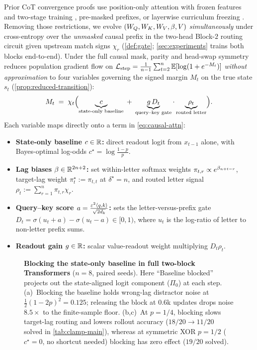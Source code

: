 Prior CoT convergence proofs use position-only attention with frozen features and two-stage training \citep{kim2024parity}, pre-masked prefixes, or layerwise curriculum freezing \citep{wen2024sparse,huang2025cotgd}. Removing those restrictions, we evolve $(W_Q, W_K, W_V, \beta, V)$ \emph{simultaneously} under cross-entropy over the \emph{unmasked} causal prefix in the two-head Block-$2$ routing circuit given upstream match signs $\chi_r$ (\cref{def:gate}; \cref{sec:experiments} trains both blocks end-to-end). Under the full causal mask, parity and head-swap symmetry reduces population gradient flow on $\mathcal L_{\mathrm{step}} = \frac{1}{n-1}\sum_{t=2}^n \mathbb E[\log(1 + e^{-M_t})]$ \emph{without approximation} to four variables governing the signed margin $M_t$ on the true state $s_t$ (\cref{prop:reduced-transition}):
\[
  M_t \;=\; \chi_t\Bigl(\underbrace{c}_{\text{state-only baseline}} \;+\; \underbrace{g\,D_t}_{\text{query--key gate}}\cdot\underbrace{\rho_t}_{\text{routed letter}}\Bigr).
\]
Each variable maps directly onto a term in \cref{eq:causal-attn}:
\begin{itemize}[leftmargin=*,itemsep=1.5pt,topsep=2pt]
\item \textbf{State-only baseline $c \in \mathbb R$:} direct readout logit from $x_{t-1}$ alone, with Bayes-optimal log-odds $c^\star = \log\frac{1-p}{p}$.
\item \textbf{Lag biases $\beta \in \mathbb R^{2n+2}$:} set within-letter softmax weights $\pi_{t,r} \propto e^{\beta_{n+t-r}}$, target-lag weight $\pi_t^\star := \pi_{t,t}$ at $\delta^\star = n$, and routed letter signal $\rho_t := \sum_{r=1}^n \pi_{t,r}\chi_r$.
\item \textbf{Query--key score $a = \frac{\varepsilon^2\langle q, k\rangle}{\sqrt{2d_k}}$:} sets the letter-versus-prefix gate $D_t = \sigma(u_t + a) - \sigma(u_t - a) \in [0, 1)$, where $u_t$ is the log-ratio of letter to non-letter prefix sums.
\item \textbf{Readout gain $g \in \mathbb R$:} scalar value-readout weight multiplying $D_t\rho_t$.
\end{itemize}

\begin{figure}[t]
\centering
\fitwidth{}
\caption{\textbf{Blocking the state-only baseline in full two-block Transformers} ($n=8$, paired seeds). Here ``Baseline blocked'' projects out the state-aligned logit component ($\Pi_0$) at each step. (a)~Blocking the baseline holds wrong-lag distractor noise at $\frac{1}{2}(1-2p)^2 = 0.125$; releasing the block at $0.6$k updates drops noise $8.5\times$ to the finite-sample floor. (b,c)~At $p=1/4$, blocking slows target-lag routing and lowers rollout accuracy ($18/20 \to 11/20$ solved in \cref{tab:clamp-main}), whereas at symmetric XOR $p=1/2$ ($c^\star=0$, no shortcut needed) blocking has zero effect ($19/20$ solved).}
\label{fig:causal-intervention}
\end{figure}

